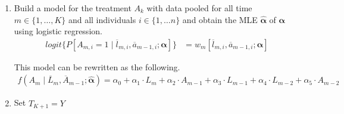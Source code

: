 \begin{enumerate}
\item Build a model for the treatment $A_k$ with data pooled for all time $m \in \{1, \dots, K \}$ and all individuals $i \in \{1, \dots n\}$ and obtain the MLE $\hat{\mathbf{\alpha}}$ of $\mathbf{\alpha}$ using logistic regression. 
\begin{align} 
logit\{P[A_{m,i} = 1 \mid \overline{l}_{m,i}, \overline{a}_{m-1,i}; \mathbf{\alpha}]\} &= w_m [\overline{l}_{m,i}, \overline{a}_{m-1,i}; \mathbf{\alpha}]
\end{align} 

This model can be rewritten as the following.  
\begin{align} 
f(A_m \mid \overline{L}_m, \overline{A}_{m-1}; \hat{\mathbf{\alpha}}) = \alpha_{0} + \alpha_{1} \cdot L_{m} + \alpha_{2} \cdot A_{m-1} + \alpha_{3} \cdot L_{m-1} + \alpha_{4} \cdot L_{m-2} + \alpha_{5} \cdot A_{m-2} 
\end{align} 

\item Set $\hat{T}_{K+1} = Y$ 


\end{enumerate}
